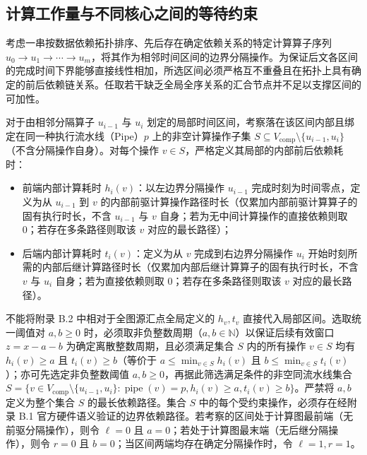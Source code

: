 \documentclass[anonymous,notoc]{gmcm2026}
\providecommand{\tightlist}{\setlength{\itemsep}{0pt}\setlength{\parskip}{0pt}}
\begin{document}
\subsection{计算工作量与不同核心之间的等待约束}

考虑一串按数据依赖拓扑排序、先后存在确定依赖关系的特定计算算子序列 \(u_0 \to u_1 \to \cdots \to u_m\)，将其作为相邻时间区间的边界分隔操作。为保证后文各区间的完成时间下界能够直接线性相加，所选区间必须严格互不重叠且在拓扑上具有确定的前后依赖链关系。任取若干缺乏全局全序关系的汇合节点并不足以支撑区间的可加性。

对于由相邻分隔算子 \(u_{i-1}\) 与 \(u_i\) 划定的局部时间区间，考察落在该区间内部且绑定在同一种执行流水线（Pipe）\(p\) 上的非空计算操作子集 \(S \subseteq V_{\mathrm{comp}} \setminus \{u_{i-1}, u_i\}\)（不含分隔操作自身）。对每个操作 \(v \in S\)，严格定义其局部的内部前后依赖耗时：

\begin{itemize}
\tightlist
\item
  前端内部计算耗时 \(h_i(v)\)：以左边界分隔操作 \(u_{i-1}\) 完成时刻为时间零点，定义为从 \(u_{i-1}\) 到 \(v\) 的内部前驱计算操作路径时长（仅累加内部前驱计算算子的固有执行时长，不含 \(u_{i-1}\) 与 \(v\) 自身；若为无中间计算操作的直接依赖则取 0；若存在多条路径则取该 \(v\) 对应的最长路径）；
\item
  后端内部计算耗时 \(t_i(v)\)：定义为从 \(v\) 完成到右边界分隔操作 \(u_i\) 开始时刻所需的内部后继计算路径时长（仅累加内部后继计算算子的固有执行时长，不含 \(v\) 与 \(u_i\) 自身；若为直接依赖则取 0；若存在多条路径则取该 \(v\) 对应的最长路径）。
\end{itemize}

不能将附录 B.2 中相对于全图源汇点全局定义的 \(h_v, t_v\) 直接代入局部区间。选取统一阈值对 \(a, b \ge 0\) 时，必须取非负整数周期（\(a, b \in \mathbb{N}\)）以保证后续有效窗口 \(z = x - a - b\) 为确定离散整数周期，且必须满足集合 \(S\) 内的所有操作 \(v \in S\) 均有 \(h_i(v) \ge a\) 且 \(t_i(v) \ge b\)（等价于 \(a \le \min_{v \in S} h_i(v)\) 且 \(b \le \min_{v \in S} t_i(v)\)）；亦可先选定非负整数阈值 \(a, b \ge 0\)，再据此筛选满足条件的非空同流水线集合 \(S = \{v \in V_{\mathrm{comp}} \setminus \{u_{i-1}, u_i\} : \operatorname{pipe}(v) = p, h_i(v) \ge a, t_i(v) \ge b\}\)。严禁将 \(a, b\) 定义为整个集合 \(S\) 的最长依赖路径。集合 \(S\) 中的每个受约束操作，必须存在经附录 B.1 官方硬件语义验证的边界依赖路径。若考察的区间处于计算图最前端（无前驱分隔操作），则令 \(\ell = 0\) 且 \(a = 0\)；若处于计算图最末端（无后继分隔操作），则令 \(r = 0\) 且 \(b = 0\)；当区间两端均存在确定分隔操作时，令 \(\ell = 1, r = 1\)。
\end{document}

